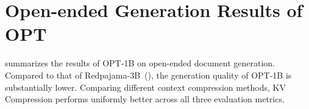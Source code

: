 \section{Open-ended Generation Results of OPT}
 summarizes the results of OPT-1B on open-ended document generation. Compared to that of Redpajama-3B~(), the generation quality of OPT-1B is substantially lower. Comparing different context compression methods, KV 
Compression performs uniformly better across all three evaluation metrics.
\label{appendix:memory}